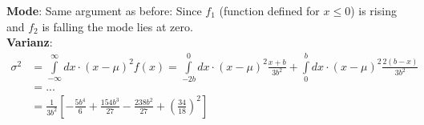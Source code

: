 \documentclass[10pt]{article}
\newenvironment{myfont}{\fontfamily{put}\selectfont}{\par}
\begin{document}
\begin{myfont}
\begin{itemize}
  \noindent \textbf{Mode}: Same argument as before: Since $f_{1}$ (function defined for $x \leq 0$) is rising and $f_{2}$ is falling the mode lies at zero. \\

  \noindent \textbf{Varianz}: 
  \begin{align*}
  \sigma^{2} & = \int\limits_{-\infty}^{\infty}dx \cdot (x - \mu)^{2}f(x) = \int\limits_{-2b}^{0}dx \cdot (x - \mu)^{2}\frac{x+b}{3b^{2}} + \int\limits_{0}^{b}dx \cdot (x - \mu)^{2}\frac{2(b-x)}{3b^{2}} \\
             & = ... \\
             & = \frac{1}{3b^{2}}\left[- \frac{5b^{4}}{6} + \frac{154b^{3}}{27} - \frac{238b^{2}}{27} + \left(\frac{34}{18}\right)^{2}\right]
  \end{align*}
\end{itemize}

\end{myfont}
\end{document}
